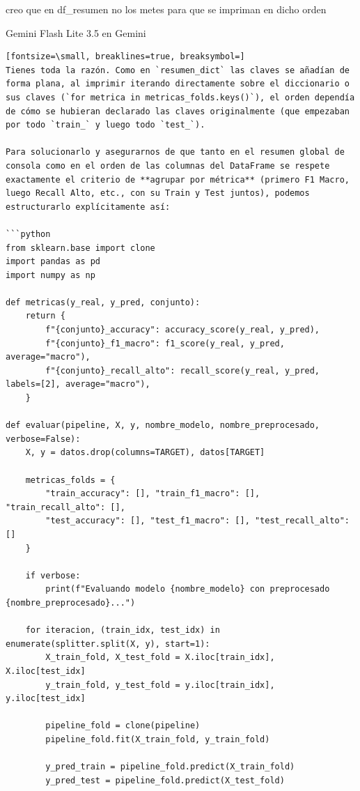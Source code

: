 \documentclass[12pt,a4paper,oneside]{book}
\begin{document}
\begin{iaprompt}
creo que en df\_resumen no los metes para que se impriman en dicho orden
\end{iaprompt}
\begin{iaresp}{Gemini Flash Lite 3.5 en Gemini}
\begin{Verbatim}[fontsize=\small, breaklines=true, breaksymbol=]
Tienes toda la razón. Como en `resumen_dict` las claves se añadían de forma plana, al imprimir iterando directamente sobre el diccionario o sus claves (`for metrica in metricas_folds.keys()`), el orden dependía de cómo se hubieran declarado las claves originalmente (que empezaban por todo `train_` y luego todo `test_`).

Para solucionarlo y asegurarnos de que tanto en el resumen global de consola como en el orden de las columnas del DataFrame se respete exactamente el criterio de **agrupar por métrica** (primero F1 Macro, luego Recall Alto, etc., con su Train y Test juntos), podemos estructurarlo explícitamente así:

```python
from sklearn.base import clone
import pandas as pd
import numpy as np

def metricas(y_real, y_pred, conjunto):
    return {
        f"{conjunto}_accuracy": accuracy_score(y_real, y_pred),
        f"{conjunto}_f1_macro": f1_score(y_real, y_pred, average="macro"),
        f"{conjunto}_recall_alto": recall_score(y_real, y_pred, labels=[2], average="macro"),
    }

def evaluar(pipeline, X, y, nombre_modelo, nombre_preprocesado, verbose=False):
    X, y = datos.drop(columns=TARGET), datos[TARGET]
    
    metricas_folds = {
        "train_accuracy": [], "train_f1_macro": [], "train_recall_alto": [],
        "test_accuracy": [], "test_f1_macro": [], "test_recall_alto": []
    }
    
    if verbose:
        print(f"Evaluando modelo {nombre_modelo} con preprocesado {nombre_preprocesado}...")
        
    for iteracion, (train_idx, test_idx) in enumerate(splitter.split(X, y), start=1):
        X_train_fold, X_test_fold = X.iloc[train_idx], X.iloc[test_idx]
        y_train_fold, y_test_fold = y.iloc[train_idx], y.iloc[test_idx]
        
        pipeline_fold = clone(pipeline)
        pipeline_fold.fit(X_train_fold, y_train_fold)
        
        y_pred_train = pipeline_fold.predict(X_train_fold)
        y_pred_test = pipeline_fold.predict(X_test_fold)
        

\end{Verbatim}
\end{iaresp}
\end{document}
